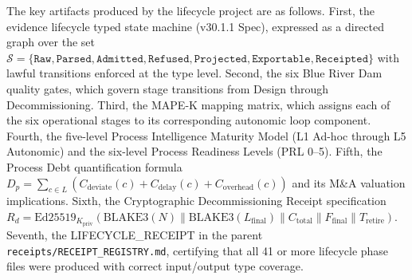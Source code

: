 The key artifacts produced by the lifecycle project are as follows. First, the evidence
lifecycle typed state machine (v30.1.1 Spec), expressed as a directed graph over the set
$\mathcal{S} = \{\texttt{Raw}, \texttt{Parsed}, \texttt{Admitted}, \texttt{Refused},
\texttt{Projected}, \texttt{Exportable}, \texttt{Receipted}\}$ with lawful transitions
enforced at the type level. Second, the six Blue River Dam quality gates, which govern
stage transitions from Design through Decommissioning. Third, the MAPE-K mapping matrix,
which assigns each of the six operational stages to its corresponding autonomic loop
component. Fourth, the five-level Process Intelligence Maturity Model (L1 Ad-hoc through
L5 Autonomic) and the six-level Process Readiness Levels (PRL 0--5). Fifth, the Process
Debt quantification formula $D_p = \sum_{c \in L}(C_{\mathrm{deviate}}(c) +
C_{\mathrm{delay}}(c) + C_{\mathrm{overhead}}(c))$ and its M\&A valuation implications.
Sixth, the Cryptographic Decommissioning Receipt specification $R_d =
\mathrm{Ed25519}_{K_{\mathrm{priv}}}(\mathrm{BLAKE3}(N) \parallel \mathrm{BLAKE3}(L_{\mathrm{final}})
\parallel C_{\mathrm{total}} \parallel F_{\mathrm{final}} \parallel T_{\mathrm{retire}})$.
Seventh, the LIFECYCLE\_RECEIPT in the parent \texttt{receipts/RECEIPT\_REGISTRY.md},
certifying that all 41 or more lifecycle phase files were produced with correct input/output
type coverage.
